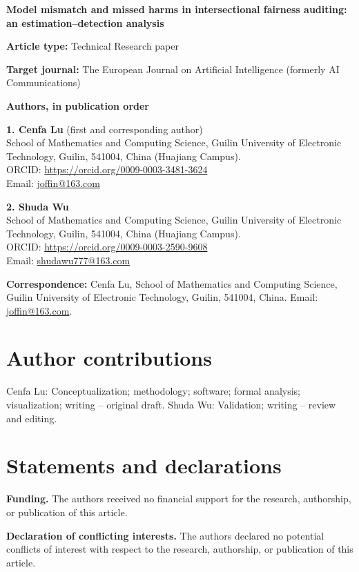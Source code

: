 \documentclass[11pt,a4paper]{article}
\begin{document}
{\Large\bfseries Model mismatch and missed harms in intersectional fairness auditing: an estimation--detection analysis\par}

\textbf{Article type:} Technical Research paper

\textbf{Target journal:} The European Journal on Artificial Intelligence (formerly AI Communications)

\textbf{Authors, in publication order}

\textbf{1. Cenfa Lu} (first and corresponding author)\\
School of Mathematics and Computing Science, Guilin University of Electronic Technology, Guilin, 541004, China (Huajiang Campus).\\
ORCID: \url{https://orcid.org/0009-0003-3481-3624}\\
Email: \href{mailto:joffin@163.com}{joffin@163.com}

\textbf{2. Shuda Wu}\\
School of Mathematics and Computing Science, Guilin University of Electronic Technology, Guilin, 541004, China (Huajiang Campus).\\
ORCID: \url{https://orcid.org/0009-0003-2590-9608}\\
Email: \href{mailto:shudawu777@163.com}{shudawu777@163.com}

\textbf{Correspondence:} Cenfa Lu, School of Mathematics and Computing Science, Guilin University of Electronic Technology, Guilin, 541004, China. Email: \href{mailto:joffin@163.com}{joffin@163.com}.

\section*{Author contributions}
Cenfa Lu: Conceptualization; methodology; software; formal analysis; visualization; writing -- original draft. Shuda Wu: Validation; writing -- review and editing.

\section*{Statements and declarations}
\textbf{Funding.} The authors received no financial support for the research, authorship, or publication of this article.

\textbf{Declaration of conflicting interests.} The authors declared no potential conflicts of interest with respect to the research, authorship, or publication of this article.
\end{document}
